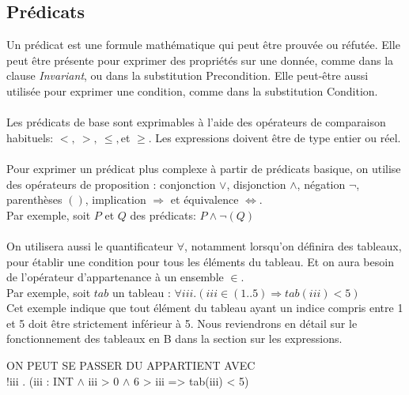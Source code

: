 \subsection{Prédicats}

Un prédicat est une formule mathématique qui peut être prouvée ou
réfutée. Elle peut être présente pour exprimer des propriétés sur une
donnée, comme dans la clause \emph{Invariant}, ou dans la substitution
Precondition. Elle peut-être aussi utilisée pour exprimer une
condition, comme dans la substitution Condition.

\paragraph{}
Les prédicats de base sont exprimables à l'aide des opérateurs de
comparaison habituels: $<,~>,~\leq,$et $\geq$. Les expressions doivent
être de type entier ou réel.

\paragraph{}
Pour exprimer un prédicat plus complexe à partir de prédicats basique,
on utilise des opérateurs de proposition : conjonction $\vee$,
disjonction $\wedge$, négation $\neg$, parenthèses $()$, implication
$\Rightarrow$ et équivalence $\Leftrightarrow$.\\
Par exemple, soit $P$ et $Q$ des prédicats: $P\wedge\neg(Q)$

\paragraph{}
On utilisera aussi le quantificateur $\forall$, notamment lorsqu'on
définira des tableaux, pour établir une condition pour tous les
éléments du tableau. Et on aura besoin de l'opérateur d'appartenance à
un ensemble $\in$.\\
Par exemple, soit $tab$ un tableau : $\forall iii . (iii \in (1..5)
\Rightarrow tab(iii) < 5)$\\
Cet exemple indique que tout élément du tableau ayant un indice compris
entre 1 et 5 doit être strictement inférieur à 5. Nous reviendrons en
détail sur le fonctionnement des tableaux en B dans la section sur les
expressions.

ON PEUT SE PASSER DU APPARTIENT AVEC \\
!iii . (iii : INT $\wedge$ iii > 0 $\wedge$ 6 > iii => tab(iii) < 5) 


